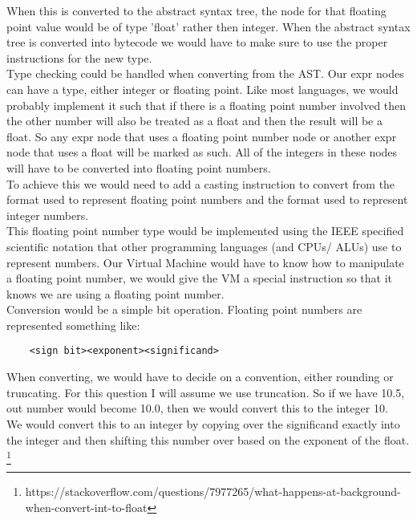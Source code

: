 \documentclass[11pt]{article}
\begin{document}
When this is converted to the abstract syntax tree, the node for that floating
point value would be of type 'float' rather then integer.  When the abstract
syntax tree is converted into bytecode we would have to make sure to use the
proper instructions for the new type.\\

Type checking could be handled when converting from the AST.  Our expr nodes
can have a type, either integer or floating point.  Like most languages, we
would probably implement it such that if there is a floating point number
involved then the other number will also be treated as a float and then the
result will be a float.  So any expr node that uses a floating point number
node or another expr node that uses a float will be marked as such.  All of the
integers in these nodes will have to be converted into floating point
numbers.\\


To achieve this we would need to add a casting instruction to convert from the
format used to represent floating point numbers and the format used to
represent integer numbers.\\

This floating point number type would be implemented using the IEEE specified
scientific notation that other programming languages (and CPUs/ ALUs) use to
represent numbers. Our Virtual Machine would have to know how to manipulate a
floating point number, we would give the VM a special instruction so that it
knows we are using a floating point number.\\

Conversion would be a simple bit operation.  Floating point numbers are
represented something like:\\
\begin{lstlisting}
    <sign bit><exponent><significand>
\end{lstlisting}


When converting, we would have to decide on a convention, either rounding or
truncating.  For this question I will assume we use truncation.  So if we have
10.5, out number would become 10.0, then we would convert this to the integer
10.\\
We would convert this to an integer by copying over the significand exactly
into the integer and then shifting this number over based on the exponent of
the float. \footnote{https://stackoverflow.com/questions/7977265/what-happens-at-background-when-convert-int-to-float}
\end{document}
